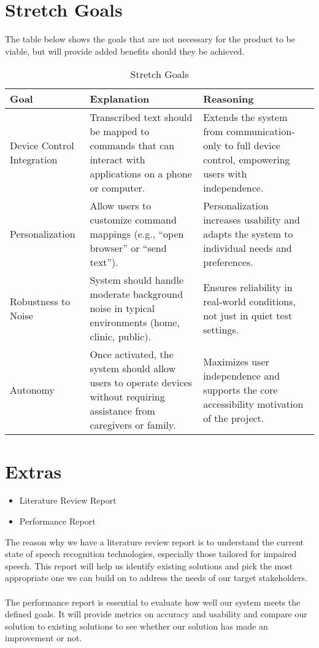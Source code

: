 \documentclass{article}
\begin{document}
\newpage

\section{Stretch Goals}
The table below shows the goals that are not necessary for the product to be viable, but will provide added benefits should they be achieved.

\begin{table}[hp]
\caption{Stretch Goals}
\begin{tabularx}{\textwidth}{lXX} \\[-8pt]
\toprule
\textbf{Goal} & \textbf{Explanation} & \textbf{Reasoning}\\
\midrule
Device Control Integration & Transcribed text should be mapped to commands that can interact with applications on a phone or computer. & Extends the system from communication-only to full device control, empowering users with independence.\\
Personalization & Allow users to customize command mappings (e.g., ``open browser'' or ``send text''). & Personalization increases usability and adapts the system to individual needs and preferences.\\
Robustness to Noise & System should handle moderate background noise in typical environments (home, clinic, public). & Ensures reliability in real-world conditions, not just in quiet test settings.\\
Autonomy & Once activated, the system should allow users to operate devices without requiring assistance from caregivers or family. & Maximizes user independence and supports the core accessibility motivation of the project.\\
\bottomrule
\end{tabularx}
\end{table}

\newpage

\section{Extras}
\begin{itemize}
    \item Literature Review Report
    \item Performance Report
\end{itemize}
The reason why we have a literature review report is to understand the current state of speech recognition technologies, especially those tailored for impaired speech. This report will help us identify existing solutions and pick the most appropriate one we can build on to address the needs of our target stakeholders.
\\
\\
The performance report is essential to evaluate how well our system meets the defined goals. It will provide metrics on accuracy and usability and compare our solution to existing solutions to see whether our solution has made an improvement or not.
\end{document}
